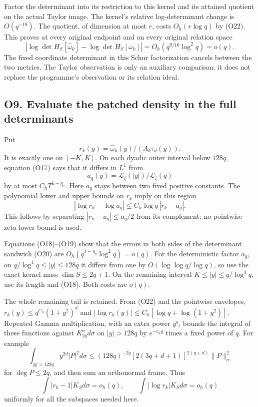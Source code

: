 \documentclass[11pt,a4paper]{article}
\begin{document}
Factor the determinant into its restriction to this kernel and its
attained quotient on the actual Taylor image. The kernel's relative
log-determinant change is \(O(q^{-18})\). The quotient, of dimension at
most \(r\), costs \(O_h(r\log q)\) by (O22). This proves at every
original endpoint and on every original relation space \[
|\log\det H_S[\widehat\omega_k]-\log\det H_S[\omega_k]|
=O_h(q^{9/10}\log^2q)=o(q).\tag{O24}
\] The fixed coordinate determinant in this Schur factorization cancels
between the two metrics. The Taylor observation is only an auxiliary
comparison; it does not replace the programme's observation or its
relation ideal.

\subsection{O9. Evaluate the patched density in the full
determinants}\label{sa:o9.-evaluate-the-patched-density-in-the-full-determinants}

Put \[
r_k(y)=\widehat\omega_k(y)/(A_k\tau_d(y)).
\] It is exactly one on \([-K,K]\). On each dyadic outer interval below
\(128q\), equation (O17) says that it differs in \(L^1\) from \[
a_q(y)=\mathcal L_\zeta(|y|)/\mathcal L_\zeta(q)
\] by at most \(C_hT^{1-\eta_0}\). Here \(a_q\) stays between two fixed
positive constants. The polynomial lower and upper bounds on \(r_k\)
imply on this region \[
|\log r_k-\log a_q|\le C_h\log q\,|r_k-a_q|.\tag{O25}
\] This follows by separating \(|r_k-a_q|\le a_q/2\) from its
complement; no pointwise zeta lower bound is used.

Equations (O18)--(O19) show that the errors in both sides of the
determinant sandwich (O20) are \(O_h(q^{1-\eta_0}\log^2q)=o(q)\). For
the deterministic factor \(a_q\), on \(q/\log^4q\le|y|\le128q\) it
differs from one by \(O(\log\log q/\log q)\), so use the exact kernel
mass \(\dim S\le2q+1\). On the remaining interval
\(K\le|y|\le q/\log^4q\), use its length and (O18). Both costs are
\(o(q)\).

The whole remaining tail is retained. From (O22) and the pointwise
envelopes, \(r_k(y)\le q^{C_h}(1+y^2)^d\) and
\(|\log r_k(y)|\le C_h[\log q+\log(1+y^2)]\). Repeated Gamma
multiplication, with an extra power \(y^q\), bounds the integral of
these functions against \(K_{2q}^\sigma d\sigma\) on \(|y|>128q\) by
\(e^{-c_hq}\) times a fixed power of \(q\). For example \[
\int_{|y|>128q}y^{2d}|P|^2d\sigma
\le(128q)^{-2q}[2(3q+d+1)]^{2(q+d)}\|P\|_\sigma^2
\] for \(\deg P\le2q\), and then sum an orthonormal frame. Thus \[
\boxed{\int|r_k-1|K_Sd\sigma=o_h(q),\qquad
\int|\log r_k|K_Sd\sigma=o_h(q)}\tag{O26}
\] uniformly for all the subspaces needed here.
\end{document}
